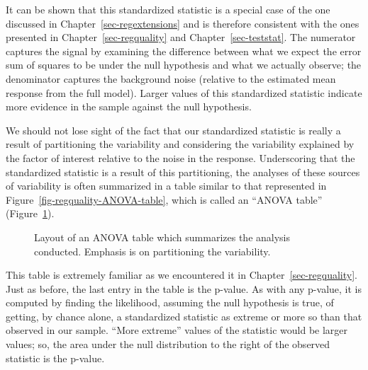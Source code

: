 \documentclass[
  letterpaper,
  DIV=11,
  numbers=noendperiod]{scrreprt}
\theoremstyle{definition}
\theoremstyle{definition}
\theoremstyle{plain}
\theoremstyle{remark}
\begin{document}
It can be shown that this standardized statistic is a special case of
the one discussed in Chapter~\ref{sec-regextensions} and is therefore
consistent with the ones presented in Chapter~\ref{sec-regquality} and
Chapter~\ref{sec-teststat}. The numerator captures the signal by
examining the difference between what we expect the error sum of squares
to be under the null hypothesis and what we actually observe; the
denominator captures the background noise (relative to the estimated
mean response from the full model). Larger values of this standardized
statistic indicate more evidence in the sample against the null
hypothesis.

We should not lose sight of the fact that our standardized statistic is
really a result of partitioning the variability and considering the
variability explained by the factor of interest relative to the noise in
the response. Underscoring that the standardized statistic is a result
of this partitioning, the analyses of these sources of variability is
often summarized in a table similar to that represented in
Figure~\ref{fig-regquality-ANOVA-table}, which is called an ``ANOVA
table'' (Figure~\ref{fig-anovateststat-anova-table}).

\begin{figure}


\caption{\label{fig-anovateststat-anova-table}Layout of an ANOVA table
which summarizes the analysis conducted. Emphasis is on partitioning the
variability.}

\end{figure}%

This table is extremely familiar as we encountered it in
Chapter~\ref{sec-regquality}. Just as before, the last entry in the
table is the p-value. As with any p-value, it is computed by finding the
likelihood, assuming the null hypothesis is true, of getting, by chance
alone, a standardized statistic as extreme or more so than that observed
in our sample. ``More extreme'' values of the statistic would be larger
values; so, the area under the null distribution to the right of the
observed statistic is the p-value.
\end{document}
